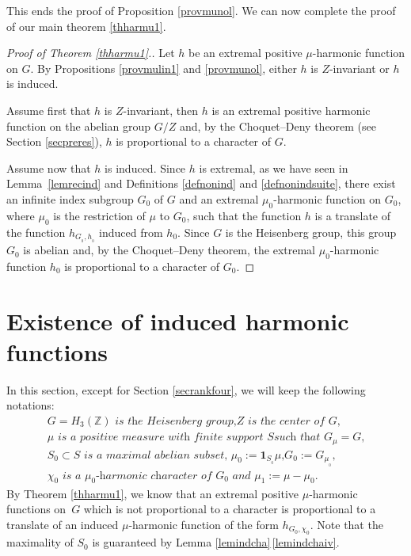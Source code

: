 \documentclass[11pt]{article}
\numberwithin{equation}{section}
\theoremstyle{definition}
\newcommand{\m}[1]{\mathbb{ #1}}
\begin{document}
This ends the proof of Proposition \ref{provmunol}. We can now complete the proof of our main theorem \ref{thharmu1}.

\begin{proof}[Proof of Theorem \ref{thharmu1}.]
Let $h$ be an extremal positive $\mu$-harmonic function on $G$.
By Propositions \ref{provmulin1} and \ref{provmunol}, either $h$ is $Z$-invariant or
$h$ is induced.

Assume first that $h$ is $Z$-invariant, then $h$ is an extremal positive harmonic function
on the abelian group $G/Z$ and, by the Choquet--Deny theorem (see Section \ref{secpreres}),
$h$ is proportional to a character of $G$.

Assume now that $h$ is induced. Since $h$ is extremal,
as we have seen in Lemma~\ref{lemrecind} and Definitions \ref{defnonind} and \ref{defnonindsuite},
there exist an infinite index subgroup
$G_0$ of $G$ and an extremal $\mu_0$-harmonic function on $G_0$,
where $\mu_0$ is the restriction of $\mu$ to $G_0$,
such that the function $h$ is a translate of the function $h_{G_{_0},h_{_0}}$ induced from $h_0$.
Since $G$ is the Heisenberg group, this group $G_0$ is abelian
and, by the Choquet--Deny theorem, the extremal $\mu_0$-harmonic function $h_0$ is proportional to a character of $G_0$.
\end{proof}

\section{Existence of induced harmonic functions}
\label{secexiind}

In this section, except for Section \ref{secrankfour}, we will keep the following notations:
\begin{equation}
\label{eqnnotbul}
\begin{array}{l}
\textit{$G=H_3(\m Z)$ is the Heisenberg group,
$Z$ is the center of $G$,}\\
\textit{$\mu$ is a positive measure with finite support $S$
such that $G_\mu=G$,}\\
\textit{$S_0\subset S$ is a maximal abelian subset, $\mu_0:=\mathbf{1}_{S_{_0}}\mu$,
$G_0:=G_{\mu_{_0}}$,}\\
\textit{$\chi_0$ is a $\mu_0$-harmonic character of $G_0$ and $\mu_1:=\mu-\mu_0$.}
\end{array}
\end{equation}
By Theorem \ref{thharmu1}, we know that an extremal positive $\mu$-harmonic functions
on~$G$ which is not proportional to a character is proportional to
a translate of an induced $\mu$\nobreakdash-harmonic function of the form $h_{G_0,\chi_0}$.
Note that the maximality of $S_0$ is guaranteed by Lemma \ref{lemindcha}\,\eqref{lemindchaiv}.
\end{document}
